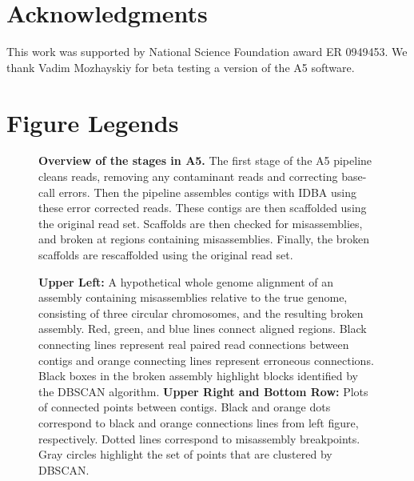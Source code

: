 \documentclass[10pt]{article}
\begin{document}
\section*{Acknowledgments}
This work was supported by National Science Foundation award ER 0949453. We thank Vadim Mozhayskiy for beta testing a
version of the A5 software.



\clearpage

\section*{Figure Legends}
\begin{figure}[hp]
\begin{center}
\end{center}
\caption{\textbf{Overview of the stages in A5.} The first stage of the A5 pipeline cleans reads, removing any contaminant
reads and correcting base-call errors. Then the pipeline assembles contigs with IDBA using these error corrected reads. These
contigs are then scaffolded using the original read set. Scaffolds are then checked for misassemblies, and broken at regions
containing misassemblies. Finally, the broken scaffolds are rescaffolded using the original read set.}
\label{fig:01}
\end{figure}

\begin{figure}[hp]
\caption{\textbf{Upper Left:}  A hypothetical whole genome alignment of an assembly containing misassemblies relative to the true genome,
consisting of three circular chromosomes, and the 
resulting broken assembly. Red, green, and blue lines connect aligned regions. Black connecting lines represent real paired read 
connections between contigs and orange connecting lines represent erroneous connections. Black boxes in the broken assembly highlight
blocks identified by the DBSCAN algorithm. \textbf{Upper Right and Bottom Row:} Plots of connected points between contigs. Black and orange dots 
correspond to black and orange connections lines from left figure, respectively. Dotted lines correspond
to misassembly breakpoints. Gray circles highlight the set of points that are clustered by DBSCAN. }
\label{fig:02}
\end{figure}
\end{document}
